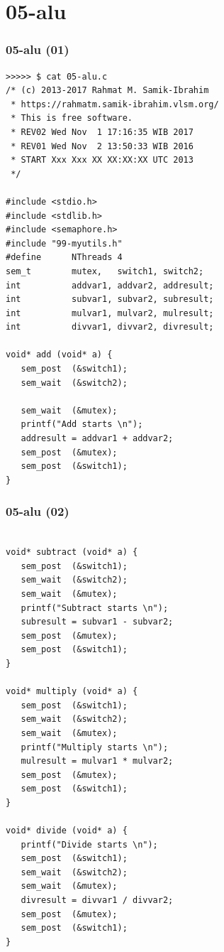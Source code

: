 \documentclass[aspectratio=169, xcolor=table, notheorems, hyperref={pdfpagelabels=false}]{beamer}
\begin{document}
\section{05-alu}
\begin{frame}[fragile]
\frametitle{05-alu (01)}
\begin{lstlisting}[basicstyle=\ttfamily\tiny]
>>>>> $ cat 05-alu.c
/* (c) 2013-2017 Rahmat M. Samik-Ibrahim
 * https://rahmatm.samik-ibrahim.vlsm.org/
 * This is free software.
 * REV02 Wed Nov  1 17:16:35 WIB 2017
 * REV01 Wed Nov  2 13:50:33 WIB 2016
 * START Xxx Xxx XX XX:XX:XX UTC 2013
 */

#include <stdio.h>
#include <stdlib.h>
#include <semaphore.h>
#include "99-myutils.h"
#define      NThreads 4
sem_t        mutex,   switch1, switch2;
int          addvar1, addvar2, addresult;
int          subvar1, subvar2, subresult;
int          mulvar1, mulvar2, mulresult;
int          divvar1, divvar2, divresult;

void* add (void* a) {
   sem_post  (&switch1);
   sem_wait  (&switch2);

   sem_wait  (&mutex);
   printf("Add starts \n");
   addresult = addvar1 + addvar2;
   sem_post  (&mutex);
   sem_post  (&switch1);
}

\end{lstlisting}
\end{frame}

\begin{frame}[fragile]
\frametitle{05-alu (02)}
\begin{lstlisting}[basicstyle=\ttfamily\tiny]

void* subtract (void* a) {
   sem_post  (&switch1);
   sem_wait  (&switch2);
   sem_wait  (&mutex);
   printf("Subtract starts \n");
   subresult = subvar1 - subvar2;
   sem_post  (&mutex);
   sem_post  (&switch1);
}

void* multiply (void* a) {
   sem_post  (&switch1);
   sem_wait  (&switch2);
   sem_wait  (&mutex);
   printf("Multiply starts \n");
   mulresult = mulvar1 * mulvar2;
   sem_post  (&mutex);
   sem_post  (&switch1);
}

void* divide (void* a) {
   printf("Divide starts \n");
   sem_post  (&switch1);
   sem_wait  (&switch2);
   sem_wait  (&mutex);
   divresult = divvar1 / divvar2;
   sem_post  (&mutex);
   sem_post  (&switch1);
}

\end{lstlisting}
\end{frame}
\end{document}
